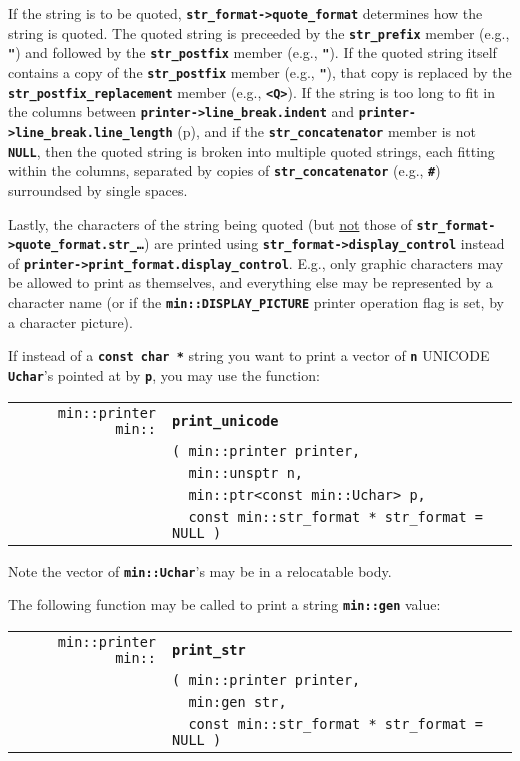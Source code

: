 \documentclass[12pt]{article}
\makeatletter
\newcommand{\TT}[1]{{\tt \bfseries #1}}
\newcommand{\ttindex}[1]{\index{#1@{\tt #1}}}
\newcommand{\pagref}[1]{p\pageref{#1}}
\newcommand{\EOL}{\penalty \exhyphenpenalty}
\newenvironment{indpar}[1][0.3in]%
	{\begin{list}{}%
		     {\setlength{\itemsep}{0in}%
		      \setlength{\topsep}{0in}%
		      \setlength{\parsep}{1ex}%
		      \setlength{\labelwidth}{#1}%
		      \setlength{\leftmargin}{#1}%
		      \addtolength{\leftmargin}{\labelsep}}%
	 \item}%
	{\end{list}}
\newcommand{\LABEL}[1]{\label{#1}}
\newlength{\ARGBREAKLENGTH}
\newcommand{\ARGBREAK}[1][\ARGBREAKLENGTH]{\\&\hspace*{#1}}
\newcommand{\MINKEY}[1]%
	   {\TT{#1}\ttindex{min::#1}\ttindex{#1}}
\makeatother
\begin{document}
If the string is to be quoted, \TT{str\_format->quote\_format}
determines how the string is quoted.  The quoted string is preceeded
by the \TT{str\_\EOL prefix} member (e.g., \TT{"}) and followed by the
\TT{str\_\EOL postfix} member (e.g., \TT{"}).  If the quoted string itself
contains a copy of the \TT{str\_\EOL postfix} member (e.g., \TT{"}),
that copy is replaced by the \TT{str\_\EOL postfix\_\EOL replacement}
member (e.g., \TT{<Q>}).  If the string is too long to fit in the
columns between \TT{printer->\EOL line\_\EOL break.indent}
and \TT{printer->\EOL line\_\EOL break.line\_\EOL length}
(\pagref{LINE-LENGTH}), and if
the \TT{str\_\EOL concatenator} member is not \TT{NULL}, then
the quoted string is broken into multiple quoted strings, each
fitting within the columns, separated by copies of
\TT{str\_\EOL concatenator} (e.g., \TT{\#})
surroundsed by single spaces.

Lastly, the characters of the string being quoted (but \underline{not}
those of \TT{str\_\EOL format->\EOL quote\_\EOL format.str\_\ldots})
are printed using \TT{str\_\EOL format->\EOL display\_\EOL control}
instead of \TT{printer->\EOL print\_\EOL format.display\_\EOL control}.
E.g., only graphic characters may be allowed to print as themselves,
and everything else may be represented by a character name
(or if the \TT{min::\EOL DISPLAY\_\EOL PICTURE} printer operation
flag is set, by a character picture).

If instead of a \TT{const char *} string you want to print a vector
of \TT{n} UNICODE \TT{Uchar}'s pointed at by \TT{p}, you may use the
function:

\begin{indpar}[1em]\begin{tabular}{r@{}l}
\verb|min::printer min::| & \MINKEY{print\_unicode}\ARGBREAK
    \verb|( min::printer printer,|\ARGBREAK
    \verb|  min::unsptr n,|\ARGBREAK
    \verb|  min::ptr<const min::Uchar> p,|\ARGBREAK
    \verb|  const min::str_format * str_format = NULL )|
\LABEL{MIN::PRINT_UNICODE} \\
\end{tabular}\end{indpar}

Note the vector of \TT{min::Uchar}'s may be in a relocatable body.

The following function may be called to print a string \TT{min::gen} value:

\begin{indpar}[1em]\begin{tabular}{r@{}l}
\verb|min::printer min::| & \MINKEY{print\_str}\ARGBREAK
    \verb|( min::printer printer,|\ARGBREAK
    \verb|  min:gen str,|\ARGBREAK
    \verb|  const min::str_format * str_format = NULL )|
\LABEL{MIN::PRINT_STR} \\
\end{tabular}\end{indpar}
\end{document}
